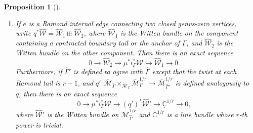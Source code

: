 \documentclass[11pt]{amsart}
\newtheorem{pr}[dummy]{Proposition}
\theoremstyle{definition}
\theoremstyle{remark}
\newcommand{\<}{\left<}
\renewcommand{\>}{\right>}
\numberwithin{equation}{section}
\def\Mbar{{\overline{\mathcal M}}}
\begin{document}
\begin{pr}[{\cite[Proposition 2.20]{TZ1}}]
\begin{enumerate}
\item If %
$e$ is a Ramond internal edge connecting two closed genus-zero vertices, write $q^*\widehat{\mathcal{W}} = \widehat{\mathcal{W}}_1 \boxplus \widehat{\mathcal{W}}_2$, where $\widehat{\mathcal{W}}_1$ is the Witten bundle on the component containing a contracted boundary tail or the anchor %
of $\Gamma$, and %
$\widehat{\mathcal{W}}_2$ is the Witten bundle on the other component.  Then there is an exact sequence
\begin{equation}
\label{eq decompose2}
0 \to \widehat{\mathcal{W}}_2 \to \mu^*i_{\Gamma}^*{\mathcal{W}} \to \widehat{\mathcal{W}}_1 \to 0.
\end{equation}
Furthermore, if $\widehat\Gamma'$ is defined to agree with $\widehat\Gamma$ except that the twist at each Ramond tail is $r-1$, and $q': \Mbar_{\widehat{\Gamma}} \times_{\Mbar_{\Gamma}} \Mbar_{\Gamma}^{1/r} \to \Mbar_{\widehat\Gamma'}^{1/r}$ is defined analogously to $q$, then there is an exact sequence
\begin{equation}
\label{eq decompose3}
0 \to \mu^*i_{\Gamma}^*{\mathcal{W}} \to (q')^*\widehat{{\mathcal{W}}}' \to {\underline{\mathbb{C}}}^{1/r} \to 0,
\end{equation}
where $\widehat{{\mathcal{W}}}'$ is the Witten bundle %
on $\Mbar_{\widehat\Gamma'}^{1/r}$ and %
${\underline{\mathbb{C}}}^{1/r}$ is a line bundle whose $r$-th power is %
trivial.


\end{enumerate}
\end{pr}
\end{document}

